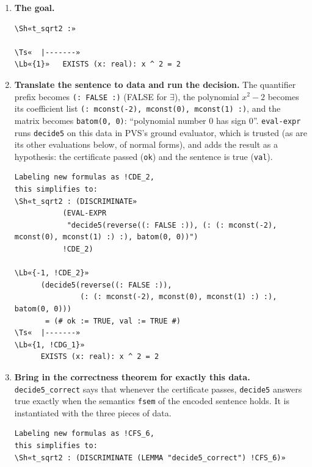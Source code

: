 \documentclass[11pt]{article}
\newcommand\Lb[1]{\textcolor{muted}{#1}}
\newcommand\Ts[1]{\textcolor{muted}{#1}}
\newcommand\Sh[1]{\textcolor{accent}{#1}}
\newcommand\code[1]{\mbox{\texttt{#1}}}
\begin{document}
\begin{enumerate}[leftmargin=1.4em, itemsep=10pt, label=\textbf{\textcolor{accent}{\arabic*}}]
\item \textbf{The goal.}
\begin{termbox}
\begin{Verbatim}[commandchars=\\«»]
\Sh«t_sqrt2 :»

\Ts«  |-------»
\Lb«{1}»   EXISTS (x: real): x ^ 2 = 2
\end{Verbatim}
\end{termbox}

\item \textbf{Translate the sentence to data and run the decision.} The quantifier prefix becomes \code{(: FALSE :)}
(FALSE for $\exists$), the polynomial $x^2 - 2$ becomes its coefficient list \texttt{(: mconst(-2), mconst(0), mconst(1) :)},
and the matrix becomes \code{batom(0, 0)}: ``polynomial number 0 has sign 0''. \texttt{eval-expr} runs \texttt{decide5} on
this data in PVS's ground evaluator, which is trusted (as are its other evaluations below, of normal forms), and adds
the result as a hypothesis:
the certificate passed (\texttt{ok}) and the sentence is true (\texttt{val}).
\begin{termbox}
\begin{Verbatim}[commandchars=\\«»]
Labeling new formulas as !CDE_2,
this simplifies to:
\Sh«t_sqrt2 : (DISCRIMINATE»
           (EVAL-EXPR
            "decide5(reverse((: FALSE :)), (: (: mconst(-2), mconst(0), mconst(1) :) :), batom(0, 0))")
           !CDE_2)

\Lb«{-1, !CDE_2}»
      (decide5(reverse((: FALSE :)),
               (: (: mconst(-2), mconst(0), mconst(1) :) :), batom(0, 0)))
       = (# ok := TRUE, val := TRUE #)
\Ts«  |-------»
\Lb«{1, !CDG_1}»
      EXISTS (x: real): x ^ 2 = 2
\end{Verbatim}
\end{termbox}

\item \textbf{Bring in the correctness theorem for exactly this data.} \texttt{decide5\_correct} says that whenever
the certificate passes, \texttt{decide5} answers true exactly when the semantics \texttt{fsem} of the encoded sentence holds.
It is instantiated with the three pieces of data.
\begin{termbox}
\begin{Verbatim}[commandchars=\\«»]
Labeling new formulas as !CFS_6,
this simplifies to:
\Sh«t_sqrt2 : (DISCRIMINATE (LEMMA "decide5_correct") !CFS_6)»


\end{Verbatim}
\end{termbox}
\end{enumerate}
\end{document}
